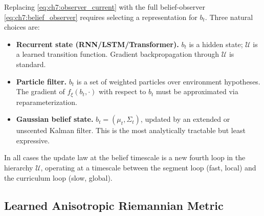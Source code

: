 Replacing \eqref{eq:ch7:observer_current} with the full
belief-observer \eqref{eq:ch7:belief_observer} requires selecting
a representation for $b_t$.
Three natural choices are:
\begin{itemize}
  \item \textbf{Recurrent state (RNN/LSTM/Transformer).}
        $b_t$ is a hidden state; $\mathcal{U}$ is a learned
        transition function.
        Gradient backpropagation through $\mathcal{U}$ is standard.
  \item \textbf{Particle filter.}
        $b_t$ is a set of weighted particles over environment
        hypotheses.
        The gradient of $f_\xi(b_t,\cdot)$ with respect to
        $b_t$ must be approximated via reparameterization.
  \item \textbf{Gaussian belief state.}
        $b_t = (\mu_t, \Sigma_t)$, updated by an
        extended or unscented Kalman filter.
        This is the most analytically tractable but least expressive.
\end{itemize}
In all cases the update law at the belief timescale is a new fourth
loop in the hierarchy $\mathcal{U}$, operating at a timescale
between the segment loop (fast, local) and the curriculum loop
(slow, global).

\subsection{Learned Anisotropic Riemannian Metric}
\label{subsec:ch7:riemannian}


